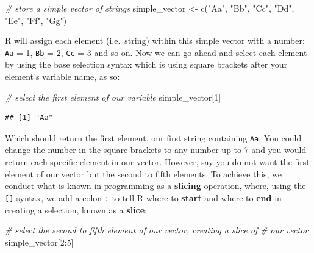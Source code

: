 \documentclass[
]{book}
\newenvironment{Shaded}{\begin{snugshade}}{\end{snugshade}}
\newcommand{\CommentTok}[1]{\textcolor[rgb]{0.56,0.35,0.01}{\textit{#1}}}
\newcommand{\DecValTok}[1]{\textcolor[rgb]{0.00,0.00,0.81}{#1}}
\newcommand{\FunctionTok}[1]{\textcolor[rgb]{0.00,0.00,0.00}{#1}}
\newcommand{\NormalTok}[1]{#1}
\newcommand{\OtherTok}[1]{\textcolor[rgb]{0.56,0.35,0.01}{#1}}
\newcommand{\SpecialCharTok}[1]{\textcolor[rgb]{0.00,0.00,0.00}{#1}}
\newcommand{\StringTok}[1]{\textcolor[rgb]{0.31,0.60,0.02}{#1}}
\begin{document}
\begin{Shaded}
\begin{Highlighting}[]
\CommentTok{\# store a simple vector of strings}
\NormalTok{simple\_vector }\OtherTok{\textless{}{-}} \FunctionTok{c}\NormalTok{(}\StringTok{"Aa"}\NormalTok{, }\StringTok{"Bb"}\NormalTok{, }\StringTok{"Cc"}\NormalTok{, }\StringTok{"Dd"}\NormalTok{, }\StringTok{"Ee"}\NormalTok{, }\StringTok{"Ff"}\NormalTok{, }\StringTok{"Gg"}\NormalTok{)}
\end{Highlighting}
\end{Shaded}

R will assign each element (i.e.~string) within this simple vector with a number: \texttt{Aa} = 1, \texttt{Bb} = 2, \texttt{Cc} = 3 and so on. Now we can go ahead and select each element by using the base selection syntax which is using square brackets after your element's variable name, as so:

\begin{Shaded}
\begin{Highlighting}[]
\CommentTok{\# select the first element of our variable}
\NormalTok{simple\_vector[}\DecValTok{1}\NormalTok{]}
\end{Highlighting}
\end{Shaded}

\begin{verbatim}
## [1] "Aa"
\end{verbatim}

Which should return the first element, our first string containing \texttt{Aa}. You could change the number in the square brackets to any number up to 7 and you would return each specific element in our vector. However, say you do not want the first element of our vector but the second to fifth elements. To achieve this, we conduct what is known in programming as a \textbf{slicing} operation, where, using the \texttt{{[}{]}} syntax, we add a colon \texttt{:} to tell R where to \textbf{start} and where to \textbf{end} in creating a selection, known as a \textbf{slice}:

\begin{Shaded}
\begin{Highlighting}[]
\CommentTok{\# select the second to fifth element of our vector, creating a \textquotesingle{}slice\textquotesingle{} of}
\CommentTok{\# our vector}
\NormalTok{simple\_vector[}\DecValTok{2}\SpecialCharTok{:}\DecValTok{5}\NormalTok{]}
\end{Highlighting}
\end{Shaded}
\end{document}
